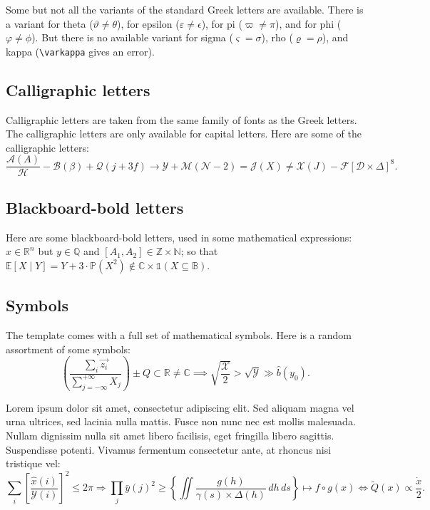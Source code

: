 \documentclass[letterpaper,11pt,leqno]{article}
\begin{document}
Some but not all the variants of the standard Greek letters are available. There is a variant for theta ($\vartheta \neq \theta$), for epsilon ($\varepsilon \neq \epsilon$), for pi ($\varpi \neq \pi$), and for phi ($\varphi \neq \phi$). But there is no available variant for sigma ($\varsigma = \sigma$), rho ($\varrho = \rho$), and kappa (\texttt{\textbackslash varkappa} gives an error).

\subsection{Calligraphic letters} 

Calligraphic letters are taken from the same family of fonts as the Greek letters. The calligraphic letters are only available for capital letters. Here are some of the calligraphic letters: 
\begin{equation*}
\frac{\mathcal{A}(A)}{\mathcal{H}} - \mathcal{B}(\beta) + \mathcal{Q}(j+3f) \to \mathcal{Y} + \mathcal{M}(\mathcal{N} - 2) = \mathcal{J}(X) \neq \mathcal{X}(J) - \mathcal{F}[\mathcal{D} \times \Delta]^8. 
\end{equation*}

\subsection{Blackboard-bold letters} 

Here are some blackboard-bold letters, used in some mathematical expressions: $x \in\mathbb{R}^n$ but $y\in \mathbb{Q}$ and $[A_1,A_2] \in \mathbb{Z} \times \mathbb{N}$; so that $\mathbb{E}[X\mid Y] = Y + 3 \cdot \mathbb{P}(X^2) \notin \mathbb{C} \times \mathbb{1}(X \subseteq \mathbb{B})$.

\subsection{Symbols} 

The template comes with a full set of mathematical symbols. Here is a random assortment of some symbols: 
\begin{equation*}
\left(\frac{\sum_i \vec{z_i}}{\sum_{j=-\infty}^{+\infty} X_j}\right) \pm Q \subset \mathbb{R} \neq \mathbb{C} \implies \sqrt{\frac{\mathcal{X}}{2}} > \sqrt{\mathcal{Y}} \gg \hat{b}(y_0).
\end{equation*}

Lorem ipsum dolor sit amet, consectetur adipiscing elit. Sed aliquam magna vel urna ultrices, sed lacinia nulla mattis. Fusce non nunc nec est mollis malesuada. Nullam dignissim nulla sit amet libero facilisis, eget fringilla libero sagittis. Suspendisse potenti. Vivamus fermentum consectetur ante, at rhoncus nisi tristique vel:
\begin{equation*}
\sum_i \left[\frac{\hat{x}(i)}{\mathcal{Y}(i)}\right]^2 \leq 2\pi \Rightarrow \prod_j \bar{y}(j)^2 \geq \left\{\iint \frac{g(h)}{\gamma(s) \times \Delta(h)}\,dh\,ds \right\} \mapsto f\circ g(x) \iff \tilde{Q}(x) \propto \frac{\dot{x}}{2}.
\end{equation*}
\end{document}
